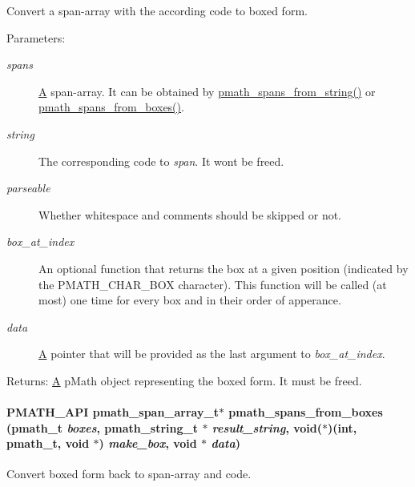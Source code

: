 Convert a span-array with the according code to boxed form. 

\begin{Desc}
\item[Parameters:]
\begin{description}
\item[{\em spans}]\hyperlink{class_a}{A} span-array. It can be obtained by \hyperlink{group__parser_g877ac507e27c8791a265105f796f3cef}{pmath\_\-spans\_\-from\_\-string()} or \hyperlink{group__parser_g9914e557782a4c7ff312b2b474fcf045}{pmath\_\-spans\_\-from\_\-boxes()}. \item[{\em string}]The corresponding code to {\em span\/}. It wont be freed. \item[{\em parseable}]Whether whitespace and comments should be skipped or not. \item[{\em box\_\-at\_\-index}]An optional function that returns the box at a given position (indicated by the PMATH\_\-CHAR\_\-BOX character). This function will be called (at most) one time for every box and in their order of apperance. \item[{\em data}]\hyperlink{class_a}{A} pointer that will be provided as the last argument to {\em box\_\-at\_\-index\/}. \end{description}
\end{Desc}
\begin{Desc}
\item[Returns:]\hyperlink{class_a}{A} pMath object representing the boxed form. It must be freed. \end{Desc}
\hypertarget{group__parser_g9914e557782a4c7ff312b2b474fcf045}{
\paragraph[{pmath\_\-spans\_\-from\_\-boxes}]{\setlength{\rightskip}{0pt plus 5cm}PMATH\_\-API {\bf pmath\_\-span\_\-array\_\-t}$\ast$ pmath\_\-spans\_\-from\_\-boxes ({\bf pmath\_\-t} {\em boxes}, \/  {\bf pmath\_\-string\_\-t} $\ast$ {\em result\_\-string}, \/  void($\ast$)(int, {\bf pmath\_\-t}, void $\ast$) {\em make\_\-box}, \/  void $\ast$ {\em data})}\hfill}
\label{group__parser_g9914e557782a4c7ff312b2b474fcf045}


Convert boxed form back to span-array and code. 

